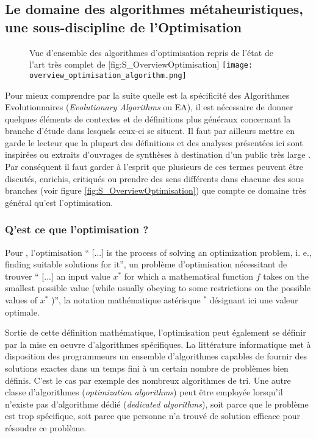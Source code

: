 \subsection{Le domaine des algorithmes métaheuristiques, une sous-discipline de l'Optimisation}

\begin{figure}[h]
\begin{sidecaption}{ Vue d'ensemble des algorithmes d'optimisation repris de l'état de l'art très complet de \textcite[32]{Weise2011}}[fig:S_OverviewOptimisation]
  \centering
 \texttt{[image: overview\_optimisation\_algorithm.png]}
  \end{sidecaption}
\end{figure}

Pour mieux comprendre par la suite quelle est la spécificité des Algorithmes Evolutionnaires (\textit{Evolutionary Algorithms} ou EA), il est nécessaire de donner quelques éléments de contextes et de définitions plus généraux concernant la branche d'étude dans lesquels ceux-ci se situent. Il faut par ailleurs mettre en garde le lecteur que la plupart des définitions et des analyses présentées ici sont inspirées ou extraits d'ouvrages de synthèses à destination d'un public très large \autocites{Weise2011, Luke2013, Brownlee2012}. Par conséquent il faut garder à l'esprit que plusieurs de ces termes peuvent être discutés, enrichis, critiqués ou prendre des sens différents dans chacune des sous branches (voir figure \ref{fig:S_OverviewOptimisation}) que compte ce domaine très général qu'est l'optimisation.

\subsubsection{Q'est ce que l'optimisation ?}
\label{sssec:Optimisation}

Pour \textcite[22]{Weise2011}, l'optimisation \foreignquote{english}{ [...] is the process of solving an optimization problem, i. e., finding suitable solutions for it}, un problème d'optimisation nécessitant de trouver \foreignquote{english}{ [...] an input value $x^*$ for which a mathematical function $f$ takes on the smallest possible value (while usually obeying to some restrictions on the possible values of $x^*$ )}, la notation mathématique astérisque $^*$ désignant ici une valeur optimale.

Sortie de cette définition mathématique, l'optimisation peut également se définir par la mise en oeuvre d'algorithmes spécifiques. La littérature informatique met à disposition des programmeurs un ensemble d'algorithmes capables de fournir des solutions exactes dans un temps fini à un certain nombre de problèmes bien définis. C'est le cas par exemple des nombreux algorithmes de tri. Une autre classe d'algorithmes (\textit{optimization algorithms}) peut être employée lorsqu'il n'existe pas d'algorithme dédié (\textit{dedicated algorithms}), soit parce que le problème est trop spécifique, soit parce que personne n'a trouvé de solution efficace pour résoudre ce problème.

